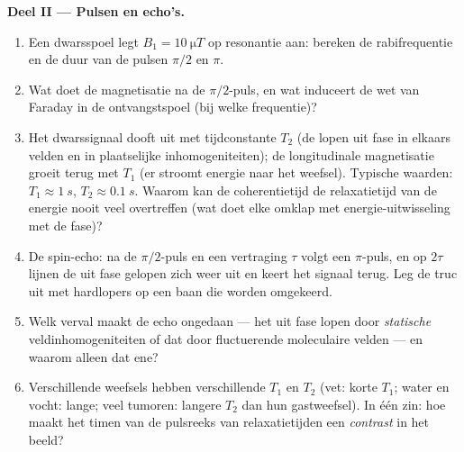 \begin{problem}
\medskip\noindent\textbf{Deel II --- Pulsen en echo's.}
\begin{enumerate}[resume]
  \item Een dwarsspoel legt $B_1 = \qty{10}{\micro T}$ op resonantie aan:
        bereken de rabifrequentie en de duur van de pulsen $\pi/2$ en
        $\pi$.
  \item Wat doet de magnetisatie na de $\pi/2$-puls, en wat induceert de
        wet van Faraday in de ontvangstspoel (bij welke frequentie)?
  \item Het dwarssignaal dooft uit met tijdconstante $T_2$ (de 
        lopen uit fase in elkaars velden en in plaatselijke
        inhomogeniteiten); de longitudinale magnetisatie groeit terug met
        $T_1$ (er stroomt energie naar het weefsel). Typische waarden:
        $T_1 \approx \qty{1}{s}$, $T_2 \approx \qty{0.1}{s}$. Waarom kan
        de coherentietijd de relaxatietijd van de energie nooit veel
        overtreffen (wat doet elke omklap met energie-uitwisseling met de
        fase)?
  \item De spin-echo: na de $\pi/2$-puls en een vertraging $\tau$ volgt
        een $\pi$-puls, en op $2\tau$ lijnen de uit fase gelopen 
        zich weer uit en keert het signaal terug. Leg de truc uit met
        hardlopers op een baan die worden omgekeerd.
  \item Welk verval maakt de echo ongedaan --- het uit fase lopen door
        \emph{statische} veldinhomogeniteiten of dat door fluctuerende
        moleculaire velden --- en waarom alleen dat ene?
  \item Verschillende weefsels hebben verschillende $T_1$ en $T_2$ (vet:
        korte $T_1$; water en vocht: lange; veel tumoren: langere $T_2$
        dan hun gastweefsel). In één zin: hoe maakt het timen van de
        pulsreeks van relaxatietijden een \emph{contrast} in het beeld?
\end{enumerate}


\end{problem}
